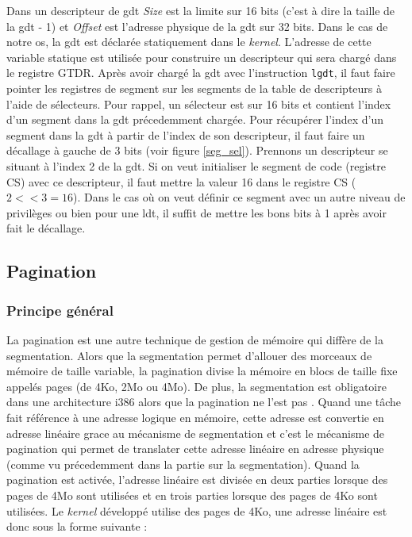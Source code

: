 Dans un descripteur de \acrshort{gdt} \textit{Size} est la limite sur 16 bits
(c'est à dire la taille de la \acrshort{gdt} - 1) et \textit{Offset} est l'adresse
physique de la \acrshort{gdt} sur 32 bits. Dans le cas de notre \acrshort{os},
la \acrshort{gdt} est déclarée statiquement dans le \textit{kernel}. L'adresse
de cette variable statique est utilisée pour construire un descripteur qui sera
chargé dans le registre GTDR. Après avoir chargé la \acrshort{gdt} avec l'instruction
\texttt{lgdt}, il faut faire pointer les registres de segment sur les
segments de la table de descripteurs à l'aide de sélecteurs. Pour rappel, un sélecteur
est sur 16 bits et contient l'index d'un segment dans la \acrshort{gdt} précedemment
chargée. Pour récupérer l'index d'un segment dans la \acrshort{gdt} à partir de
l'index de son descripteur, il faut faire un décallage à gauche de 3 bits
(voir figure \ref{seg_sel}). Prennons un descripteur se situant à l'index 2 de
la \acrshort{gdt}. Si on veut initialiser le segment de code (registre CS) avec
ce descripteur, il faut mettre la valeur 16 dans le registre CS ($2 << 3 = 16$).
Dans le cas où on veut définir ce segment avec un autre niveau de privilèges
ou bien pour une \acrshort{ldt}, il suffit de mettre les bons bits à 1 après avoir
fait le décallage.

\newpage

\subsection{Pagination}
\subsubsection{Principe général}
La pagination est une autre technique de gestion de mémoire qui diffère de la
segmentation. Alors que la segmentation permet d'allouer des morceaux de mémoire
de taille variable, la pagination divise la mémoire en blocs de taille fixe appelés
pages (de 4Ko, 2Mo ou 4Mo). De plus, la segmentation est obligatoire dans une
architecture i386 alors que la pagination ne l'est pas \cite{ref16}. Quand une tâche
fait référence à une adresse logique en mémoire, cette adresse est convertie en
adresse linéaire grace au mécanisme de segmentation et c'est le mécanisme de
pagination qui permet de translater cette adresse linéaire en adresse physique
(comme vu précedemment dans la partie sur la segmentation). Quand la
pagination est activée, l'adresse linéaire est divisée en deux parties lorsque
des pages de 4Mo sont utilisées et en trois parties lorsque des pages de 4Ko
sont utilisées. Le \textit{kernel} développé utilise des pages de 4Ko, une adresse
linéaire est donc sous la forme suivante :


